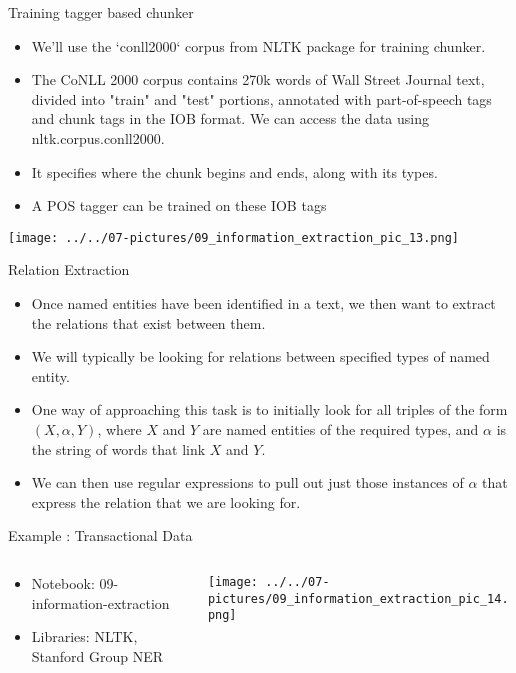\documentclass[11pt]{beamer}
\begin{document}
\begin{frame}{Training tagger based chunker}
\begin{itemize}
\item We'll use the `conll2000` corpus from NLTK package for training chunker. \item The CoNLL 2000 corpus contains 270k words of Wall Street Journal text, divided into "train" and "test" portions, annotated with part-of-speech tags and chunk tags in the IOB format. We can access the data using nltk.corpus.conll2000. 
\item It specifies where the chunk begins and ends, along with its types.
\item A POS tagger can be trained on these IOB tags
\end{itemize}
	\begin{center}
	\texttt{[image: ../../07-pictures/09\_information\_extraction\_pic\_13.png]}
	\end{center}
\end{frame}
\begin{frame}{Relation Extraction}
\begin{itemize}
\item Once named entities have been identified in a text, we then want to extract the relations that exist between them. 
\item We will typically be looking for relations between specified types of named entity. 
\item One way of approaching this task is to initially look for all triples of the form $(X, \alpha, Y)$, where $X$ and $Y$ are named entities of the required types, and $\alpha$ is the string of words that link $X$ and $Y$. 
\item We can then use regular expressions to pull out just those instances of $\alpha$ that express the relation that we are looking for. 
\end{itemize}
\end{frame}
\begin{frame}{Example : Transactional Data }
\begin{columns}[T] %
\begin{column}{.48\textwidth}
        \begin{itemize}
		\item Notebook: 09-information-extraction
		\item Libraries: NLTK, Stanford Group NER
        \end{itemize}
\end{column}%
\hfill%
\begin{column}{.48\textwidth}
        \texttt{[image: ../../07-pictures/09\_information\_extraction\_pic\_14.png]}
\end{column}%
\end{columns}
\end{frame}
\end{document}
